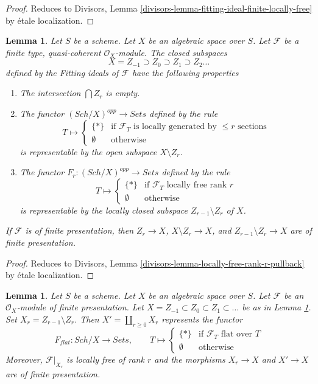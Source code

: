 \documentclass{stacks-project}
\theoremstyle{plain}
\newtheorem{lemma}[subsection]{Lemma}
\theoremstyle{definition}
\theoremstyle{remark}
\numberwithin{equation}{subsection}
\def\Sch{\mathit{Sch}}
\begin{document}
\begin{proof}
Reduces to
Divisors, Lemma \ref{divisors-lemma-fitting-ideal-finite-locally-free}
by \'etale localization.
\end{proof}

\begin{lemma}
\label{lemma-locally-free-rank-r-pullback}
Let $S$ be a scheme. Let $X$ be an algebraic space over $S$.
Let $\mathcal{F}$ be a finite type, quasi-coherent
$\mathcal{O}_X$-module. The closed subspaces
$$
X = Z_{-1} \supset Z_0 \supset Z_1 \supset Z_2 \ldots
$$
defined by the Fitting ideals of $\mathcal{F}$ have the following
properties
\begin{enumerate}
\item The intersection $\bigcap Z_r$ is empty.
\item The functor $(\Sch/X)^{opp} \to \textit{Sets}$ defined by the rule
$$
T \longmapsto
\left\{
\begin{matrix}
\{*\} & \text{if }\mathcal{F}_T\text{ is locally generated by }
\leq r\text{ sections} \\
\emptyset & \text{otherwise}
\end{matrix}
\right.
$$
is representable by the open subspace $X \setminus Z_r$.
\item The functor $F_r : (\Sch/X)^{opp} \to \textit{Sets}$ defined by the rule
$$
T \longmapsto
\left\{
\begin{matrix}
\{*\} & \text{if }\mathcal{F}_T\text{ locally free rank }r\\
\emptyset & \text{otherwise}
\end{matrix}
\right.
$$
is representable by the locally closed subspace $Z_{r - 1} \setminus Z_r$
of $X$.
\end{enumerate}
If $\mathcal{F}$ is of finite presentation, then
$Z_r \to X$, $X \setminus Z_r \to X$, and $Z_{r - 1} \setminus Z_r \to X$
are of finite presentation.
\end{lemma}

\begin{proof}
Reduces to
Divisors, Lemma \ref{divisors-lemma-locally-free-rank-r-pullback}
by \'etale localization.
\end{proof}

\begin{lemma}
\label{lemma-finite-presentation-module}
Let $S$ be a scheme. Let $X$ be an algebraic space over $S$.
Let $\mathcal{F}$ be an $\mathcal{O}_X$-module
of finite presentation. Let $X = Z_{-1} \subset Z_0 \subset Z_1 \subset \ldots$
be as in Lemma \ref{lemma-locally-free-rank-r-pullback}.
Set $X_r = Z_{r - 1} \setminus Z_r$.
Then $X' = \coprod_{r \geq 0} X_r$ represents the functor
$$
F_{flat} : \Sch/X \longrightarrow \textit{Sets},\quad\quad
T \longmapsto
\left\{
\begin{matrix}
\{*\} & \text{if }\mathcal{F}_T\text{ flat over }T\\
\emptyset & \text{otherwise}
\end{matrix}
\right.
$$
Moreover, $\mathcal{F}|_{X_r}$ is locally free of rank $r$ and the
morphisms $X_r \to X$ and $X' \to X$ are of finite presentation.
\end{lemma}
\end{document}
